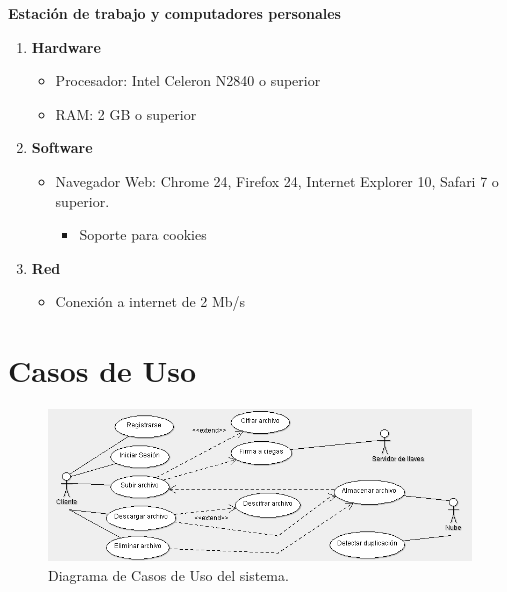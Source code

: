 \textbf{Estación de trabajo y computadores personales}
\begin{enumerate}
\item \textbf{Hardware}
\begin{itemize}
\item Procesador: Intel Celeron N2840 o superior
\item RAM: 2 GB o superior
\end{itemize}
\item \textbf{Software}
\begin{itemize}
\item Navegador Web: Chrome 24, Firefox 24, Internet Explorer 10, Safari 7 o superior.
\begin{itemize}
\item Soporte para cookies
\end{itemize}
\end{itemize}

\item \textbf{Red}
\begin{itemize}
\item Conexión a internet de 2 Mb/s
\end{itemize}

\end{enumerate}

\newpage

\section{Casos de Uso}

\begin{figure}[htbp!]
		\centering
			\includegraphics[width=1\textwidth]{images/CasosDeUso}
		\caption{Diagrama de Casos de Uso del sistema.}
	\end{figure}